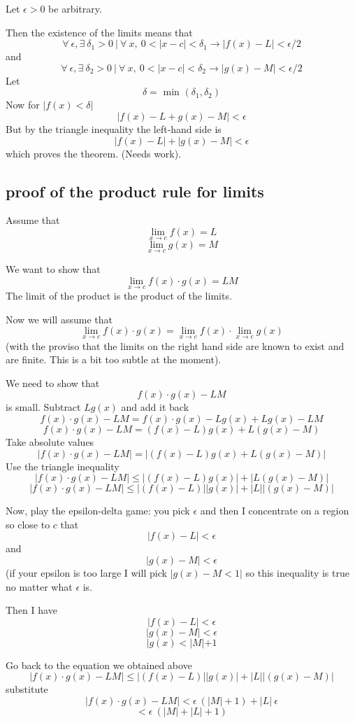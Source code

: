 \documentclass[11pt, oneside]{article}   	%
\begin{document}
Let $\epsilon > 0$ be arbitrary.

Then the existence of the limits means that
\[ \forall \ \epsilon, \exists \ \delta_1 > 0 \ | \ \forall \ x, \ 0 < | x - c| < \delta_1 \rightarrow | f(x) - L | < \epsilon/2 \]
and
\[ \forall \ \epsilon, \exists \ \delta_2 > 0 \ | \ \forall \ x, \ 0 < | x - c| < \delta_2 \rightarrow | g(x) - M | < \epsilon/2 \]
Let
\[ \delta = \text{ min } (\delta_1, \delta_2) \]
Now for $|f(x) < \delta|$
\[ | f(x) - L + g(x) - M| < \epsilon \]
But by the triangle inequality the left-hand side is 
\[   | f(x) - L| + |g(x) - M| < \epsilon \]
which proves the theorem.
(Needs work).

\subsection*{proof of the product rule for limits}
Assume that
\[ \lim_{x \rightarrow c} f(x) = L \]
\[ \lim_{x \rightarrow c} g(x) = M \]

We want to show that
\[ \lim_{x \rightarrow c} f(x) \cdot g(x) = LM \]
The limit of the product is the product of the limits.

Now we will assume that
\[ \lim_{x \rightarrow c} f(x) \cdot g(x) = \lim_{x \rightarrow c} f(x) \cdot \lim_{x \rightarrow c} g(x) \]
(with the proviso that the limits on the right hand side are known to exist and are finite.  This is a bit too subtle at the moment).

We need to show that
\[ f(x) \cdot g(x) - LM \]
is small.  Subtract $L g(x)$ and add it back
\[ f(x) \cdot g(x) - LM = f(x) \cdot g(x) - L g(x) + L g(x) - LM \]
\[ f(x) \cdot g(x) - LM = (f(x) - L) g(x) + L (g(x) - M ) \]
Take absolute values
\[ |f(x) \cdot g(x) - LM| = |(f(x) - L) g(x) + L (g(x) - M )| \]
Use the triangle inequality
\[ |f(x) \cdot g(x) - LM| \le |(f(x) - L) g(x)| + |L (g(x) - M )| \]
\[ |f(x) \cdot g(x) - LM| \le |(f(x) - L) | | g(x) | + | L | | (g(x) - M )| \]

Now, play the epsilon-delta game:  you pick $\epsilon$ and then I concentrate on a region so close to $c$ that
\[ |f(x) - L | < \epsilon \]
and
\[ |g(x) - M | < \epsilon \]
(if your epsilon is too large I will pick $|g(x) - M < 1|$ so this inequality is true no matter what $\epsilon$ is.

Then I have
\[ |f(x) - L | < \epsilon \]
\[ |g(x) - M | < \epsilon \]
\[ |g(x) < |M| + 1 \]

Go back to the equation we obtained above
\[ |f(x) \cdot g(x) - LM| \le |(f(x) - L) | | g(x)| + | L | | (g(x) - M )| \]
substitute
\[ |f(x) \cdot g(x) - LM| < \epsilon \ (|M| + 1) + | L | \ \epsilon \]
\[ < \epsilon \ (|M| + |L| + 1) \]
\end{document}
